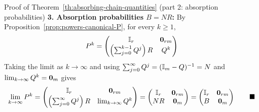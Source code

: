 \documentclass[aspectratio=169]{beamer}\usepackage[]{graphicx}\usepackage[]{xcolor}
\begin{document}
\begin{frame}{Proof of Theorem~\ref{th:absorbing-chain-quantities} (part 2: absorption probabilities)}
\textbf{3. Absorption probabilities $B = N R$:} By Proposition~\ref{prop:powers-canonical-P}, for every $k \ge 1$,
\[
P^k = \begin{pmatrix}
\II_r & \b0_{rm} \\
\left(\sum_{j=0}^{k-1} Q^j\right) R & Q^k
\end{pmatrix}
\]
\vfill
Taking the limit as $k \to \infty$ and using $\sum_{j=0}^\infty Q^j = (\mathbb{I}_m - Q)^{-1} = N$ and $\lim_{k\to\infty} Q^k = \b0_m$ gives
\[
\lim_{k\to\infty} P^k = \begin{pmatrix} \II_r & \b0_{rm} \\ \left(\sum_{j=0}^\infty Q^j\right) R & \lim_{k\to\infty} Q^k \end{pmatrix} = \begin{pmatrix} \II_r & \b0_{rm} \\ N R & \b0_m \end{pmatrix} = \begin{pmatrix} \II_r & \b0_{rm} \\ B & \b0_m \end{pmatrix} \qquad \blacksquare
\]
\end{frame}


\end{document}
